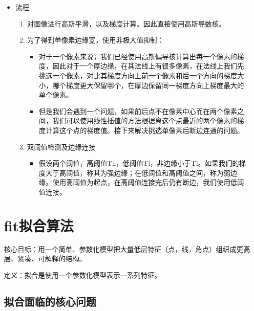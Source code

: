\documentclass[UTF8]{ctexart}
\begin{document}
\begin{itemize}
    \item 流程
    \begin{enumerate}
        \item 对图像进行高斯平滑，以及梯度计算。因此直接使用高斯导数核。
        \item 为了得到单像素边缘宽，使用非极大值抑制：
        \begin{itemize}
            \item 对于一个像素来说，我们已经使用高斯偏导核计算出每一个像素的梯度，因此对于一个厚边缘，在其法线上有很多像素，在法线上我们先挑选一个像素，对比其梯度方向上前一个像素和后一个方向的梯度大小，哪个梯度更大保留哪个，在厚边保留同一梯度方向上梯度最大的单个像素。
            \item 但是我们会遇到一个问题，如果前后点不在像素中心而在两个像素之间，我们可以使用线性插值的方法根据离这个点最近的两个像素的梯度计算这个点的梯度值。接下来解决挑选单像素后断边连通的问题。
        \end{itemize}
        \item 双阈值检测及边缘连接
        \begin{itemize}
            \item 假设两个阈值，高阈值Th，低阈值Tl，非边缘小于Tl。如果我们的梯度大于高阈值，称其为强边缘；在低阈值和高阈值之间，称为弱边缘。使用高阈值为起点，在高阈值连接完后仍有断边，我们使用低阈值连接。
        \end{itemize}
    \end{enumerate}
\end{itemize}

\section{fit拟合算法}

核心目标：用一个简单、参数化模型把大量低层特征（点，线，角点）组织成更高层、紧凑、可解释的结构。

定义：拟合是使用一个参数化模型表示一系列特征。

\subsection{拟合面临的核心问题}
\end{document}
